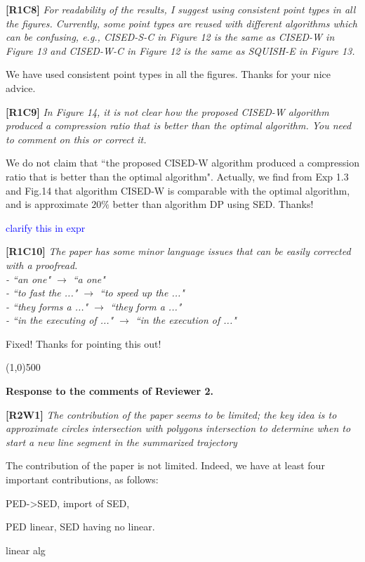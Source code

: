 \documentclass{letter}
\begin{document}
\textbf{[R1C8]} \emph{For readability of the results, I suggest using consistent point types in all the figures. Currently, some point types are reused with different algorithms which can be confusing, e.g., CISED-S-C in Figure 12 is the same as CISED-W in Figure 13 and CISED-W-C in Figure 12 is the same as SQUISH-E in Figure 13.}

We have used consistent point types in all the figures. Thanks for your nice advice.

\textbf{[R1C9]} \emph{In Figure 14, it is not clear how the proposed CISED-W algorithm produced a compression ratio that is better than the optimal algorithm. You need to comment on this or correct it.}

We do not claim that ``the proposed CISED-W algorithm produced a compression ratio that is better than the optimal algorithm".
Actually, we find from Exp 1.3 and Fig.14 that algorithm CISED-W is comparable with the optimal algorithm, and is approximate $20\%$ better than algorithm DP using SED. 
Thanks!

\textcolor{blue}{clarify this in expr}

\textbf{[R1C10]} \emph{The paper has some minor language issues that can be easily corrected with a proofread.\\
- ``an one" $\rightarrow$ ``a one" \\
- ``to fast the ..." $\rightarrow$ ``to speed up the ..." \\
- ``they forms a ..." $\rightarrow$ ``they form a ..."	\\
- ``in the executing of ..." $\rightarrow$ ``in the execution of ..."
}


Fixed! Thanks for pointing this out!

\line(1,0){500}

\textbf{Response to the comments of Reviewer 2.}

\textbf{[R2W1]} \emph{The contribution of the paper seems to be limited; the key idea is to approximate circles intersection with polygons intersection to determine when to start a new line segment in the summarized trajectory}

The contribution of the paper is not limited. Indeed, we have at least four important contributions, as follows:

PED->SED, import of SED, 

PED linear, SED having no linear. 

linear alg
\end{document}
